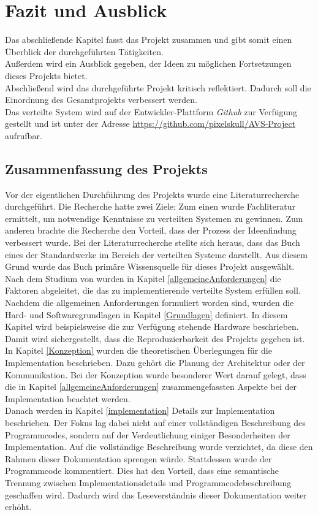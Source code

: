 \chapter{Fazit und Ausblick}
Das abschließende Kapitel fasst das Projekt zusammen und gibt somit einen Überblick der durchgeführten Tätigkeiten.\\
 Außerdem wird ein Ausblick gegeben, der Ideen zu möglichen Fortsetzungen dieses Projekts bietet. \\
 Abschließend wird das durchgeführte Projekt kritisch reflektiert. Dadurch soll die Einordnung des Gesamtprojekts verbessert werden.\\
 
Das verteilte System wird auf der Entwickler-Plattform \emph{Github} zur Verfügung gestellt und ist unter der Adresse \url{https://github.com/pixelskull/AVS-Project} aufrufbar.

\section{Zusammenfassung des Projekts}
Vor der eigentlichen Durchführung des Projekts wurde eine Literaturrecherche durchgeführt. Die Recherche hatte zwei Ziele: Zum einen wurde Fachliteratur ermittelt, um notwendige Kenntnisse zu verteilten Systemen zu gewinnen. Zum anderen brachte die Recherche den Vorteil, dass der Prozess der Ideenfindung verbessert wurde. Bei der Literaturrecherche stellte sich heraus, dass das Buch \citep{tanenbaum} eines der Standardwerke im Bereich der verteilten Systeme darstellt. Aus diesem Grund wurde das Buch primäre Wissensquelle für dieses Projekt ausgewählt. \\
Nach dem Studium von \citep{tanenbaum} wurden in Kapitel \ref{allgemeineAnforderungen} die Faktoren abgeleitet, die das zu implementierende verteilte System erfüllen soll. \\
Nachdem die allgemeinen Anforderungen formuliert worden sind, wurden die Hard- und Softwaregrundlagen in Kapitel \ref{Grundlagen} definiert. In diesem Kapitel wird beispielsweise die zur Verfügung stehende Hardware beschrieben. Damit wird sichergestellt, dass die Reproduzierbarkeit des Projekts gegeben ist. \\
In Kapitel \ref{Konzeption} wurden die theoretischen Überlegungen für die Implementation beschrieben. Dazu gehört die Planung der Architektur oder der Kommunikation. Bei der Konzeption wurde besonderer Wert darauf gelegt, dass die in Kapitel \ref{allgemeineAnforderungen} zusammengefassten Aspekte bei der Implementation beachtet werden. \\
Danach werden in Kapitel \ref{implementation} Details zur Implementation beschrieben. Der Fokus lag dabei nicht auf einer vollständigen Beschreibung des Programmcodes, sondern auf der Verdeutlichung einiger Besonderheiten der Implementation. Auf die vollständige Beschreibung wurde verzichtet, da diese den Rahmen dieser Dokumentation sprengen würde. Stattdessen wurde der Programmcode kommentiert. Dies hat den Vorteil, dass eine semantische Trennung zwischen Implementationsdetails und Programmcodebeschreibung geschaffen wird. Dadurch wird das Leseverständnis dieser Dokumentation weiter erhöht. 

